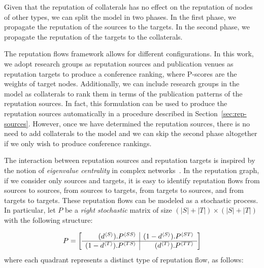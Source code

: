 \documentclass[notitlepage]{svjour3}
\begin{document}
Given that the reputation of collaterals has no effect on
the reputation of nodes of other types, we can split the model
in two phases. In the first phase, we propagate the reputation
of the sources to the targets. In the second phase, we
propagate the reputation of the targets to the collaterals.

The reputation flows framework allows for different configurations.
In this work, we adopt research groups as reputation sources and publication 
venues as reputation targets to produce a conference ranking, 
where P-scores are the weights of target nodes. Additionally, we can include
research groups in the model as collaterals to rank them
in terms of the publication patterns of the reputation sources. In fact, this 
formulation can be used to produce the reputation sources automatically in a
procedure described in Section~\ref{sec:rep-sources}. However, 
once we have determined the reputation sources, there is no need to add
collaterals to the model and we can skip the second phase altogether if we 
only wish to produce conference rankings.



The interaction between reputation sources and reputation targets is inspired by the 
notion of {\em eigenvalue centrality} in complex 
networks~\cite{Brin1998,Langville2008,Newman2010}. 
In the reputation graph, if we consider only sources and targets, it is easy to 
identify reputation flows from sources to sources, from sources to targets, from 
targets to sources, and from targets to targets. These reputation flows can be 
modeled as a stochastic process. 
In particular, let $P$ be a \emph{right stochastic} %
matrix of size $(|S|+|T|) \times (|S|+|T|)$ with the following structure: 

\newcommand{\bkt}[1]{ {^{\langle #1 \rangle}} }

\begin{align}\label{eq:newp}
P =
\left[
\begin{array}{r | r}
(d\bkt{S}) . P\bkt{SS}  & (1-d\bkt{S}) . P\bkt{ST} \\
\hline
(1-d\bkt{T}) . P\bkt{TS}  & (d\bkt{T}) . P\bkt{TT} \\
\end{array}
\right]
\end{align}
\noindent where each quadrant represents a distinct type of reputation flow, as follows: 
\end{document}
